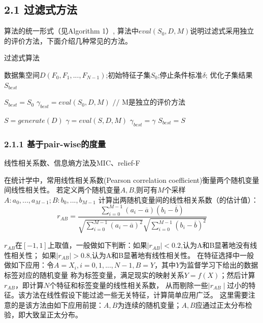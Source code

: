 \documentclass[a4paper,UTF8]{article}
\begin{document}
\subsection*{2.1 过滤式方法}
  算法的统一形式（见Algorithm 1）,  算法中$ eval(S_{0}, D, M)$说明过滤式采用独立的评价方法，下面介绍几种常见的方法。

  \begin{algorithm}
    \caption{过滤式算法}
    \begin{algorithmic}[1]
      \REQUIRE 数据集空间$D(F_{0}, F_{1},..., F_{N-1})$;初始特征子集$S_{0}$;停止条件标准$\delta$;
      \ENSURE 优化子集结果$S_{best}$

      \STATE $S_{best}=S_{0}$
      \STATE $\gamma_{best}=eval(S_{0},D,M)$          $//$ M是独立的评价方法

        \STATE $S=generate(D)$
        \STATE $\gamma=eval(S,D,M)$
            \STATE $\gamma_{best}=\gamma$
            \STATE $S_{best}=S$
          \ENDIF
      \ENDWHILE


    \end{algorithmic}
  \end{algorithm}


\subsubsection*{2.1.1 基于pair-wise的度量}
  线性相关系数、信息熵方法及MIC、relief-F

  在统计学中，常用线性相关系数(Pearson correlation coefficient)衡量两个随机变量间线性相关性。
  若定义两个随机变量$ A, B $,则可有$M$个采样$ A: a_{0},...,a_{M-1}; B: b_{0},...,b_{M-1}$
  计算出两随机变量间的线性相关系数（的估计值）：
  $$  r_{AB} = \frac{\sum_{i=0}^{M-1}(a_{i}-\overline{a})(b_{i}-\overline{b})}
  {\sqrt{\sum_{i=0}^{M-1}(a_{i}-\overline{a})^2}\sqrt{\sum_{i=0}^{M-1}(b_{i}-\overline{b})^2}}$$

  $ r_{AB} $在$ [-1,1]$上取值，一般做如下判断：如果$ \mid{r_{AB}}\mid<0.2$,认为A和B显著地没有线性相关性；
  如果$ \mid{r_{AB}}\mid>0.8$,认为A和B显著地有线性相关性。
  在特征选择中一般做如下应用：令$ A=X_{i},i=0,1,...,N-1, B=Y$，其中$Y$为监督学习下给出的数据标签对应的随机变量
  称为标签变量，满足现实的映射关系$Y=f(X)$；然后计算$ r_{AB} $，即计算$N$个特征和标签变量的线性相关系数，
  从而剔除一些$\mid{r_{AB}}\mid$过小的特征。该方法在线性假设下能过滤一些无关特征，计算简单应用广泛。
  这里需要注意的是该方法由如下应用前提：$A,B$为连续的随机变量；$A,B$应通过正太分布检验，即大致呈正太分布。
\end{document}
